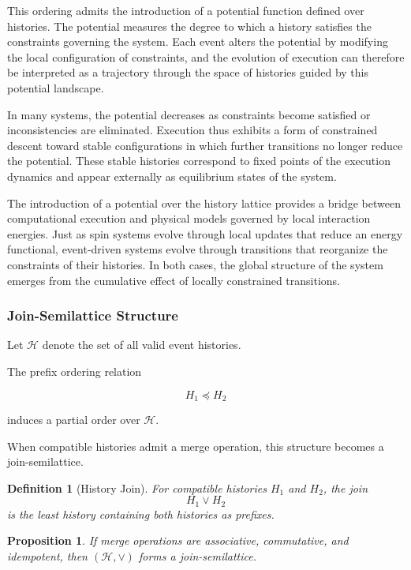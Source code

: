 \documentclass[12pt]{article}
\newtheorem{definition}{Definition}
\newtheorem{proposition}{Proposition}
\begin{document}
This ordering admits the introduction of a potential
function defined over histories. The potential measures
the degree to which a history satisfies the constraints
governing the system. Each event alters the potential by
modifying the local configuration of constraints, and the
evolution of execution can therefore be interpreted as a
trajectory through the space of histories guided by this
potential landscape.

In many systems, the potential decreases as constraints
become satisfied or inconsistencies are eliminated.
Execution thus exhibits a form of constrained descent
toward stable configurations in which further transitions
no longer reduce the potential. These stable histories
correspond to fixed points of the execution dynamics and
appear externally as equilibrium states of the system.

The introduction of a potential over the history lattice
provides a bridge between computational execution and
physical models governed by local interaction energies.
Just as spin systems evolve through local updates that
reduce an energy functional, event-driven systems evolve
through transitions that reorganize the constraints of
their histories. In both cases, the global structure of
the system emerges from the cumulative effect of locally
constrained transitions.

\subsubsection{Join-Semilattice Structure}

Let $\mathcal{H}$ denote the set of all valid event histories.

The prefix ordering relation

\[
H_1 \preceq H_2
\]

induces a partial order over $\mathcal{H}$.

When compatible histories admit a merge operation,
this structure becomes a join-semilattice.

\begin{definition}[History Join]
For compatible histories $H_1$ and $H_2$, the join
\[
H_1 \vee H_2
\]
is the least history containing both histories as prefixes.
\end{definition}

\begin{proposition}
If merge operations are associative, commutative,
and idempotent, then $(\mathcal{H}, \vee)$ forms
a join-semilattice.
\end{proposition}
\end{document}
